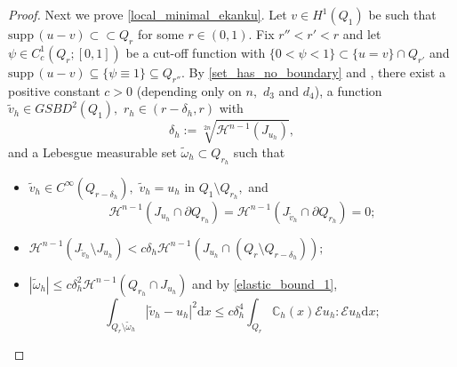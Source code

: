 \documentclass[reqno]{amsart}
\numberwithin{equation}{section}
\theoremstyle{plain}
\theoremstyle{definition}
\newcommand{\C}{\mathbb{C}}
\newcommand{\cH}{\mathcal{H}}
\newcommand{\p}{\partial}
\renewcommand{\d}{\mathrm{d}}
\newcommand{\strictlyincluded}{\subset\subset}
\renewcommand{\tilde}{\widetilde}
\newcommand{\supp}{\mathrm{supp}\,}
\newcommand{\str}[1]{\mathcal{E}#1}
\begin{document}
\begin{proof}
Next we prove \eqref{local_minimal_ekanku}. Let $v\in H^1(Q_1 )$ be such that $\supp(u-v)\strictlyincluded Q_r$ for some $r\in(0,1).$ Fix $r''<r'<r$ and let $\psi\in C_c^1 (Q_r;[0,1])$ be a cut-off function with 
$\{0<\psi<1\}\subset \{u=v\}\cap Q_{r'}$ and $\supp(u-v)\subseteq \{\psi\equiv 1\}\subseteq Q_{r''}.$ 
By \eqref{set_has_no_boundary} and \cite[Theorem 3]{CCI:2017}, there exist  a positive constant $c>0$ (depending only on $n,$ $d_3$ and $d_4$), a function $\tilde v_h\in GSBD^2(Q_1),$ $r_h\in(r-\delta_h,r)$ with
%
\begin{equation}\label{defi_delta_h}
\delta_h:=\sqrt[2n]{\cH^{n-1} (J_{u_h})},
\end{equation}
%
and  a Lebesgue measurable set $\tilde \omega_h\subset Q_{r_h}$ such that 
\begin{itemize}
\item[($\rm a_1$)] $\tilde v_h\in C^\infty(Q_{r-\delta_h} ),$ $\tilde v_h = u_h$ in $Q_1\setminus Q_{r_h},$ and  
$$
\cH^{n-1} (J_{u_h}\cap \p Q_{r_h}) = \cH^{n-1} (J_{\tilde v_h}\cap \p Q_{r_h}) = 0;
$$

\item[($\rm a_2$)] $\cH^{n-1}(J_{\tilde v_h}\setminus J_{u_h})<c \delta_h \cH^{n-1}(J_{u_h} \cap (Q_r\setminus Q_{r-\delta_h}));$

\item[($\rm a_3$)]  $|\tilde \omega_h|\le c\delta_h^2\cH^{n-1} (Q_{r_h}\cap J_{u_h})$ and by \eqref{elastic_bound_1},
%
\begin{equation}\label{sdfsdgs}
\int_{Q_r\setminus \tilde \omega_h} |\tilde v_h - u_h|^2\d x \le c\delta_h^4 \int_{Q_r} \C_h(x)\str{u_h}:\str{u_h}\d x; 
\end{equation}
%


\end{itemize}
\end{proof}
\end{document}
